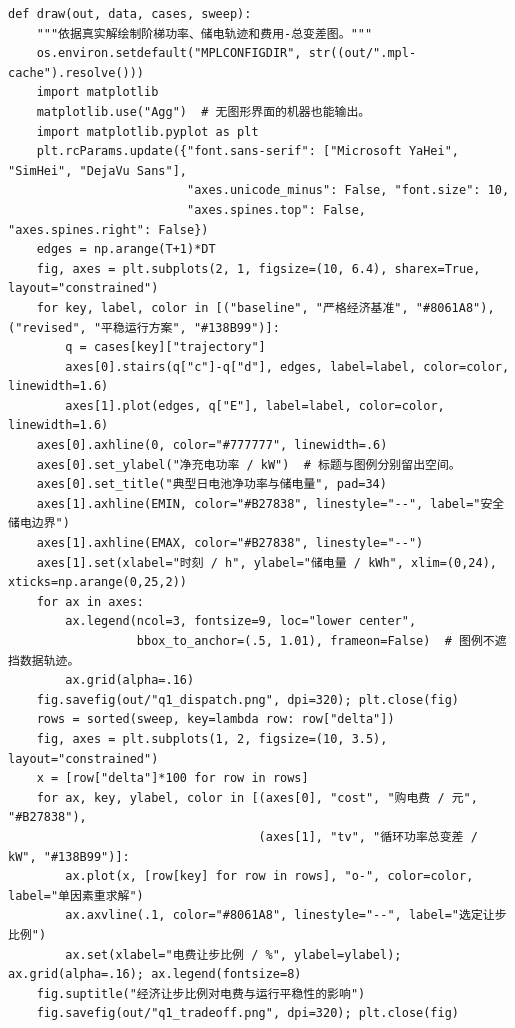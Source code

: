 \documentclass[withoutpreface,bwprint]{cumcmthesis}
\begin{document}
\begin{appendices}
\begin{lstlisting}
def draw(out, data, cases, sweep):
    """依据真实解绘制阶梯功率、储电轨迹和费用-总变差图。"""
    os.environ.setdefault("MPLCONFIGDIR", str((out/".mpl-cache").resolve()))
    import matplotlib
    matplotlib.use("Agg")  # 无图形界面的机器也能输出。
    import matplotlib.pyplot as plt
    plt.rcParams.update({"font.sans-serif": ["Microsoft YaHei", "SimHei", "DejaVu Sans"],
                         "axes.unicode_minus": False, "font.size": 10,
                         "axes.spines.top": False, "axes.spines.right": False})
    edges = np.arange(T+1)*DT
    fig, axes = plt.subplots(2, 1, figsize=(10, 6.4), sharex=True, layout="constrained")
    for key, label, color in [("baseline", "严格经济基准", "#8061A8"), ("revised", "平稳运行方案", "#138B99")]:
        q = cases[key]["trajectory"]
        axes[0].stairs(q["c"]-q["d"], edges, label=label, color=color, linewidth=1.6)
        axes[1].plot(edges, q["E"], label=label, color=color, linewidth=1.6)
    axes[0].axhline(0, color="#777777", linewidth=.6)
    axes[0].set_ylabel("净充电功率 / kW")  # 标题与图例分别留出空间。
    axes[0].set_title("典型日电池净功率与储电量", pad=34)
    axes[1].axhline(EMIN, color="#B27838", linestyle="--", label="安全储电边界")
    axes[1].axhline(EMAX, color="#B27838", linestyle="--")
    axes[1].set(xlabel="时刻 / h", ylabel="储电量 / kWh", xlim=(0,24), xticks=np.arange(0,25,2))
    for ax in axes:
        ax.legend(ncol=3, fontsize=9, loc="lower center",
                  bbox_to_anchor=(.5, 1.01), frameon=False)  # 图例不遮挡数据轨迹。
        ax.grid(alpha=.16)
    fig.savefig(out/"q1_dispatch.png", dpi=320); plt.close(fig)
    rows = sorted(sweep, key=lambda row: row["delta"])
    fig, axes = plt.subplots(1, 2, figsize=(10, 3.5), layout="constrained")
    x = [row["delta"]*100 for row in rows]
    for ax, key, ylabel, color in [(axes[0], "cost", "购电费 / 元", "#B27838"),
                                   (axes[1], "tv", "循环功率总变差 / kW", "#138B99")]:
        ax.plot(x, [row[key] for row in rows], "o-", color=color, label="单因素重求解")
        ax.axvline(.1, color="#8061A8", linestyle="--", label="选定让步比例")
        ax.set(xlabel="电费让步比例 / %", ylabel=ylabel); ax.grid(alpha=.16); ax.legend(fontsize=8)
    fig.suptitle("经济让步比例对电费与运行平稳性的影响")
    fig.savefig(out/"q1_tradeoff.png", dpi=320); plt.close(fig)



\end{lstlisting}
\end{appendices}
\end{document}
